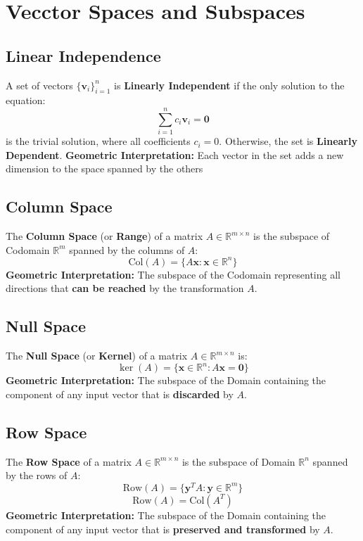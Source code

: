 \documentclass{article}
\begin{document}
\newpage
\section{Vecctor Spaces and Subspaces}

\subsection{Linear Independence}
A set of vectors $\{\mathbf{v}_i\}_{i=1}^n$ is \textbf{Linearly Independent} if the only solution to the equation:
\[
    \sum_{i=1}^{n} c_i \mathbf{v}_i = \mathbf{0}
\]
is the trivial solution, where all coefficients $c_i = 0$. Otherwise, the set is \textbf{Linearly Dependent}.
\newline
\textbf{Geometric Interpretation:} Each vector in the set adds a new dimension to the space spanned by the others

\subsection{Column Space}
The \textbf{Column Space} (or \textbf{Range}) of a matrix $A \in \mathbb{R}^{m \times n}$ is the subspace of Codomain $\mathbb{R}^m$ spanned by the columns of $A$:
\[
    \text{Col}(A) = \{ A\mathbf{x} : \mathbf{x} \in \mathbb{R}^n \}
\]
\textbf{Geometric Interpretation:} The subspace of the Codomain representing all directions that \textbf{can be reached} by the transformation $A$.

\subsection{Null Space}
The \textbf{Null Space} (or \textbf{Kernel}) of a matrix $A \in \mathbb{R}^{m \times n}$ is:
\[
    \ker(A) = \{ \mathbf{x} \in \mathbb{R}^n : A\mathbf{x} = \mathbf{0} \}
\]
\textbf{Geometric Interpretation:} The subspace of the Domain containing the component of any input vector that is \textbf{discarded} by $A$.

\subsection{Row Space}
The \textbf{Row Space} of a matrix $A \in \mathbb{R}^{m \times n}$ is the subspace of Domain $\mathbb{R}^n$ spanned by the rows of $A$:
\[
    \text{Row}(A) = \{ \mathbf{y}^T A : \mathbf{y} \in \mathbb{R}^m \}
\]
\[
    \text{Row}(A) = \text{Col}(A^T)
\]
\textbf{Geometric Interpretation:} The subspace of the Domain containing the component of any input vector that is \textbf{preserved and transformed} by $A$.
\end{document}

